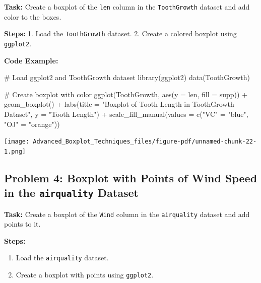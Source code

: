 \documentclass[
  letterpaper,
  DIV=11,
  numbers=noendperiod]{scrreprt}
\newenvironment{Shaded}{\begin{snugshade}}{\end{snugshade}}
\newcommand{\AttributeTok}[1]{\textcolor[rgb]{0.40,0.45,0.13}{#1}}
\newcommand{\CommentTok}[1]{\textcolor[rgb]{0.37,0.37,0.37}{#1}}
\newcommand{\FunctionTok}[1]{\textcolor[rgb]{0.28,0.35,0.67}{#1}}
\newcommand{\NormalTok}[1]{\textcolor[rgb]{0.00,0.23,0.31}{#1}}
\newcommand{\OtherTok}[1]{\textcolor[rgb]{0.00,0.23,0.31}{#1}}
\newcommand{\SpecialCharTok}[1]{\textcolor[rgb]{0.37,0.37,0.37}{#1}}
\newcommand{\StringTok}[1]{\textcolor[rgb]{0.13,0.47,0.30}{#1}}
\providecommand{\tightlist}{%
  \setlength{\itemsep}{0pt}\setlength{\parskip}{0pt}}\usepackage{longtable,booktabs,array}
\begin{document}
\textbf{Task:} Create a boxplot of the \texttt{len} column in the
\texttt{ToothGrowth} dataset and add color to the boxes.

\textbf{Steps:} 1. Load the \texttt{ToothGrowth} dataset. 2. Create a
colored boxplot using \texttt{ggplot2}.

\textbf{Code Example:}

\begin{Shaded}
\begin{Highlighting}[]
\CommentTok{\# Load ggplot2 and ToothGrowth dataset}
\FunctionTok{library}\NormalTok{(ggplot2)}
\FunctionTok{data}\NormalTok{(ToothGrowth)}

\CommentTok{\# Create boxplot with color}
\FunctionTok{ggplot}\NormalTok{(ToothGrowth, }\FunctionTok{aes}\NormalTok{(}\AttributeTok{y =}\NormalTok{ len, }\AttributeTok{fill =}\NormalTok{ supp)) }\SpecialCharTok{+}
  \FunctionTok{geom\_boxplot}\NormalTok{() }\SpecialCharTok{+}
  \FunctionTok{labs}\NormalTok{(}\AttributeTok{title =} \StringTok{"Boxplot of Tooth Length in ToothGrowth Dataset"}\NormalTok{, }\AttributeTok{y =} \StringTok{"Tooth Length"}\NormalTok{) }\SpecialCharTok{+}
  \FunctionTok{scale\_fill\_manual}\NormalTok{(}\AttributeTok{values =} \FunctionTok{c}\NormalTok{(}\StringTok{"VC"} \OtherTok{=} \StringTok{"blue"}\NormalTok{, }\StringTok{"OJ"} \OtherTok{=} \StringTok{"orange"}\NormalTok{))}
\end{Highlighting}
\end{Shaded}

\texttt{[image: Advanced\_Boxplot\_Techniques\_files/figure-pdf/unnamed-chunk-22-1.png]}

\subsection*{\texorpdfstring{Problem 4: Boxplot with Points of Wind
Speed in the \texttt{airquality}
Dataset}{Problem 4: Boxplot with Points of Wind Speed in the airquality Dataset}}\label{problem-4-boxplot-with-points-of-wind-speed-in-the-airquality-dataset}

\textbf{Task:} Create a boxplot of the \texttt{Wind} column in the
\texttt{airquality} dataset and add points to it.

\textbf{Steps:}

\begin{enumerate}
\def\labelenumi{\arabic{enumi}.}
\tightlist
\item
  Load the \texttt{airquality} dataset.
\item
  Create a boxplot with points using \texttt{ggplot2}.
\end{enumerate}
\end{document}
